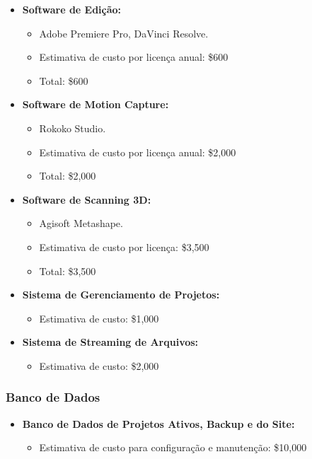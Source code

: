 \begin{itemize}
    \item \textbf{Software de Edição:}
    \begin{itemize}
        \item Adobe Premiere Pro, DaVinci Resolve.
        \item Estimativa de custo por licença anual: \$600
        \item Total: \$600
    \end{itemize}
    
    \item \textbf{Software de Motion Capture:}
    \begin{itemize}
        \item Rokoko Studio.
        \item Estimativa de custo por licença anual: \$2,000
        \item Total: \$2,000
    \end{itemize}
    
    \item \textbf{Software de Scanning 3D:}
    \begin{itemize}
        \item Agisoft Metashape.
        \item Estimativa de custo por licença: \$3,500
        \item Total: \$3,500
    \end{itemize}
    
    \item \textbf{Sistema de Gerenciamento de Projetos:}
    \begin{itemize}
        \item Estimativa de custo: \$1,000
    \end{itemize}
    
    \item \textbf{Sistema de Streaming de Arquivos:}
    \begin{itemize}
        \item Estimativa de custo: \$2,000
    \end{itemize}
\end{itemize}

\subsubsection{Banco de Dados}

\begin{itemize}
    \item \textbf{Banco de Dados de Projetos Ativos, Backup e do Site:}
    \begin{itemize}
        \item Estimativa de custo para configuração e manutenção: \$10,000
    \end{itemize}
\end{itemize}

